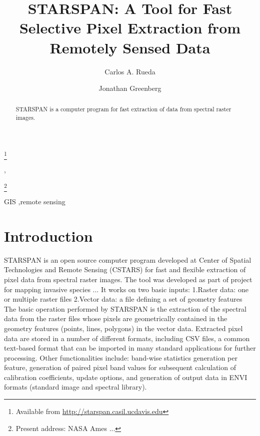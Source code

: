\documentclass{elsart}
\newcommand{\starspan}{STARSPAN{}}
\begin{document}
\begin{frontmatter}

\title{\starspan: 
A Tool for Fast Selective Pixel Extraction 
from Remotely Sensed Data}
\thanks[label1]{Available from \url{http://starspan.casil.ucdavis.edu}}

\author{Carlos A. Rueda},
\author{Jonathan Greenberg}
\thanks[greenberg]{Present address: NASA Ames ...}

\address{Center for Spatial Technologies and Remote Sensing (CSTARS).
The Barn. University of California, Davis. One Shields Avenue, Davis, CA 95616}





\begin{abstract}
	
	\starspan{} is a computer program for fast extraction of data from spectral
	raster images.
	
\end{abstract}

\begin{keyword}
GIS \sep remote sensing
\end{keyword}

\end{frontmatter}


\section{Introduction}\label{intro}

	\starspan{} is an open source computer program developed at Center of Spatial
	Technologies and Remote Sensing (CSTARS) for fast and flexible extraction of
	pixel data from spectral raster images. The tool was developed as part
	of project for mapping invasive species ... \citep{ustin04}
	It works on two basic inputs: 1.Raster
	data: one or multiple raster files 2.Vector data: a file defining a set of
	geometry features The basic operation performed by \starspan{} is the
	extraction of the spectral data from the raster files whose pixels are
	geometrically contained in the geometry features (points, lines, polygons)
	in the vector data. Extracted pixel data are stored in a number of different
	formats, including CSV files, a common text-based format that can be
	imported in many standard applications for further processing. Other
	functionalities include: band-wise statistics generation per feature,
	generation of paired pixel band values for subsequent calculation of
	calibration coefficients, update options, and generation of output data in
	ENVI formats (standard image and spectral library).
\end{document}
